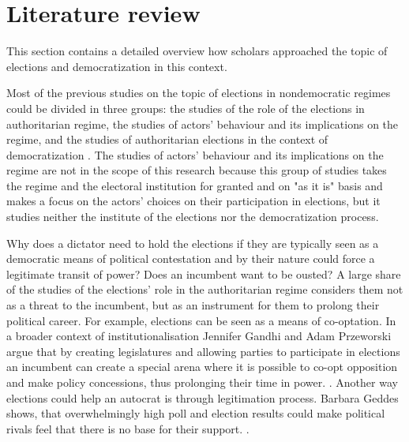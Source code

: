 \documentclass[a4paper, 12pt]{article}
\begin{document}
\section*{Literature review}
This section contains a detailed overview how scholars approached the topic of elections and democratization in this context. \par
Most of the previous studies on the topic of elections in nondemocratic regimes could be divided in three groups: the studies of the role of the elections in authoritarian regime, the studies of actors' behaviour and its implications on the regime, and the studies of authoritarian elections in the context of democratization \parencite{gandhi_elections_2009}. The studies of actors' behaviour and its implications on the regime are not in the scope of this research because this group of studies takes the regime and the electoral institution for granted and on "as it is" basis and makes a focus on the actors' choices on their participation in elections, but it studies neither the institute of the elections nor the democratization process. \par
Why does a dictator need to hold the elections if they are typically seen as a democratic means of political contestation and by their nature could force a legitimate transit of power? Does an incumbent want to be ousted? A large share of the studies of the elections' role in the authoritarian regime considers them not as a threat to the incumbent, but as an instrument for them to prolong their political career. For example, elections can be seen as a means of co-optation. In a broader context of institutionalisation Jennifer Gandhi and Adam Przeworski argue that by creating legislatures and allowing parties to participate in elections an incumbent can create a special arena where it is possible to co-opt opposition and make policy concessions, thus prolonging their time in power. \parencite{gandhi_authoritarian_2007}. Another way elections could help an autocrat is through legitimation process. Barbara Geddes shows, that overwhelmingly high poll and election results could make political rivals feel that there is no base for their support.  \parencite{geddes_role_2005}. \par %
\end{document}
